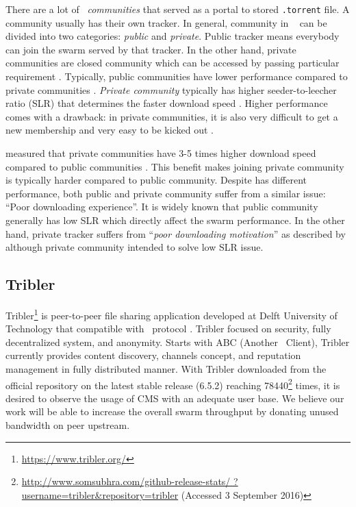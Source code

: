 There are a lot of \bt~\textit{communities} that served as a portal to stored \texttt{.torrent} file. A community usually has their own tracker. In general, community in \bt~ can be divided into two categories: \textit{public} and \textit{private}. Public tracker means everybody can join the swarm served by that tracker. In the other hand, private communities are closed community which can be accessed by passing particular requirement \cite{2010:pubpriv:meulpolder, 2014:sustainabilitytorrent:chen}. Typically, public communities have lower performance compared to private communities \cite{2010:pubpriv:meulpolder}. \textit{Private community} typically has higher seeder-to-leecher ratio (SLR) that determines the faster download speed \cite{2005:bittorrentcooperation:andrade}. Higher performance comes with a drawback: in private communities, it is also very difficult to get a new membership and very easy to be kicked out \cite{2013:survivepriv:jia}.

\citeauthor{2010:pubpriv:meulpolder} measured that private communities have 3-5 times higher download speed compared to public communities \cite{2010:pubpriv:meulpolder}. This benefit makes joining private community is typically harder compared to public community. Despite has different performance, both public and private community suffer from a similar issue: ``Poor downloading experience''. It is widely known that public community generally has low SLR which directly affect the swarm performance. In the other hand, private tracker suffers from ``\textit{poor downloading motivation}'' as described by \citeauthor{2014:sustainabilitytorrent:chen}\cite{2014:sustainabilitytorrent:chen} although private community intended to solve low SLR issue. 


\subsection{Tribler}
\label{section:tribler}
Tribler\footnote{\url{https://www.tribler.org/}} is peer-to-peer file sharing application developed at Delft University of Technology that compatible with \bt~protocol \cite{2008:tribler:pouwelse}. Tribler focused on security, fully decentralized system, and anonymity. Starts with ABC (Another \bt~Client), Tribler currently provides content discovery, channels concept, and reputation management in fully distributed manner. With Tribler downloaded from the official repository on the latest stable release (6.5.2) reaching  78440\footnote{\url{http://www.somsubhra.com/github-release-stats/ ?username=tribler&repository=tribler} (Accessed 3 September 2016)} times, it is desired to observe the usage of CMS with an adequate user base. We believe our work will be able to increase the overall swarm throughput by donating unused bandwidth on peer upstream.

